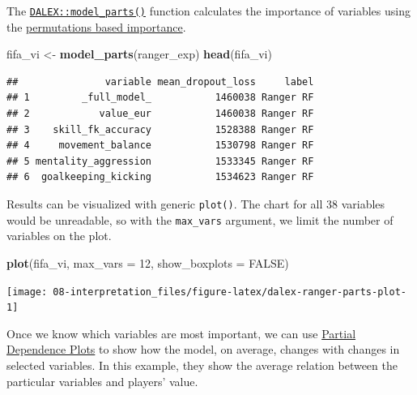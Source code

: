 \documentclass[]{scrbook}
\newenvironment{Shaded}{\begin{snugshade}}{\end{snugshade}}
\newcommand{\DataTypeTok}[1]{\textcolor[rgb]{0.13,0.29,0.53}{#1}}
\newcommand{\DecValTok}[1]{\textcolor[rgb]{0.00,0.00,0.81}{#1}}
\newcommand{\KeywordTok}[1]{\textcolor[rgb]{0.13,0.29,0.53}{\textbf{#1}}}
\newcommand{\NormalTok}[1]{#1}
\newcommand{\OperatorTok}[1]{\textcolor[rgb]{0.81,0.36,0.00}{\textbf{#1}}}
\newcommand{\OtherTok}[1]{\textcolor[rgb]{0.56,0.35,0.01}{#1}}
\newcommand{\StringTok}[1]{\textcolor[rgb]{0.31,0.60,0.02}{#1}}
\renewenvironment{Shaded} {\begin{snugshade}\small} {\end{snugshade}}
\begin{document}
The \href{https://www.rdocumentation.org/packages/DALEX/topics/model_parts}{\texttt{DALEX::model\_parts()}} function calculates the importance of variables using the \href{https://pbiecek.github.io/ema/featureImportance.html}{permutations based importance}.

\begin{Shaded}
\begin{Highlighting}[]
\NormalTok{fifa_vi <-}\StringTok{ }\KeywordTok{model_parts}\NormalTok{(ranger_exp)}
\KeywordTok{head}\NormalTok{(fifa_vi)}
\end{Highlighting}
\end{Shaded}

\begin{verbatim}
##               variable mean_dropout_loss     label
## 1         _full_model_           1460038 Ranger RF
## 2            value_eur           1460038 Ranger RF
## 3    skill_fk_accuracy           1528388 Ranger RF
## 4     movement_balance           1530798 Ranger RF
## 5 mentality_aggression           1533345 Ranger RF
## 6  goalkeeping_kicking           1534623 Ranger RF
\end{verbatim}

Results can be visualized with generic \texttt{plot()}. The chart for all 38 variables would be unreadable, so with the \texttt{max\_vars} argument, we limit the number of variables on the plot.

\begin{Shaded}
\begin{Highlighting}[]
\KeywordTok{plot}\NormalTok{(fifa_vi, }\DataTypeTok{max_vars =} \DecValTok{12}\NormalTok{, }\DataTypeTok{show_boxplots =} \OtherTok{FALSE}\NormalTok{)}
\end{Highlighting}
\end{Shaded}

\begin{center}\texttt{[image: 08-interpretation\_files/figure-latex/dalex-ranger-parts-plot-1]} \end{center}

Once we know which variables are most important, we can use \href{https://pbiecek.github.io/ema/partialDependenceProfiles.html}{Partial Dependence Plots} to show how the model, on average, changes with changes in selected variables. In this example, they show the average relation between the particular variables and players' value.

\begin{Shaded}
\end{Shaded}
\end{document}
